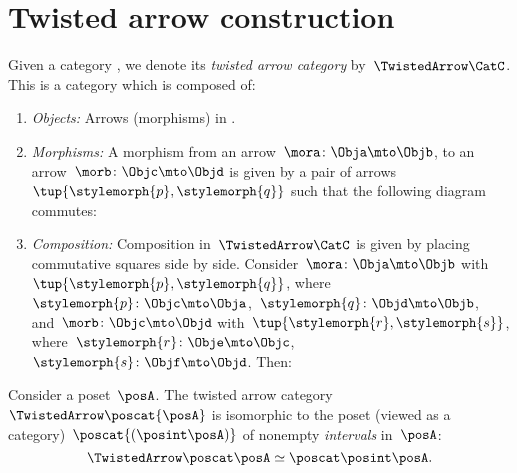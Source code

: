 
\section{Twisted arrow construction}
\begin{ctdefinition}
    \label{def:twisted-arrow-category}
    \label{def:twisted-arrow}
    Given a category \CatC, we denote its \emph{twisted arrow category} by~$\TwistedArrow\CatC$.
    This is a category which is composed of:
    \begin{enumerate}
        \item \emph{Objects:} Arrows (morphisms) in \CatC.
        \item \emph{Morphisms:}
              A morphism from an arrow~$\mora\colon \Obja \mto \Objb $, to an arrow~$\morb\colon \Objc \mto \Objd$ is given by a pair of arrows~$\tup{\stylemorph{p},\stylemorph{q}}$ such that the following diagram commutes:
        \item \emph{Composition:} Composition in~$\TwistedArrow\CatC$ is given by placing commutative squares side by side.
              Consider~$\mora\colon \Obja \mto \Objb$ with~$\tup{\stylemorph{p},\stylemorph{q}}$, where~$\stylemorph{p}\colon \Objc\mto \Obja$,~$\stylemorph{q}\colon \Objd \mto \Objb$, and~$\morb\colon \Objc \mto \Objd$ with~$\tup{\stylemorph{r},\stylemorph{s}}$, where~$\stylemorph{r}\colon \Obje\mto \Objc$,~$\stylemorph{s}\colon \Objf \mto \Objd$.
              Then:
    \end{enumerate}
\end{ctdefinition}


\begin{example}
    \label{exa:twisted-arrow-poset}
    Consider a poset~$\posA$.
    The twisted arrow category~$\TwistedArrow \poscat{\posA}$ is isomorphic to the poset (viewed as a category)~$\poscat{\left(\posint\posA\right)}$ of nonempty \emph{intervals} in~$\posA$:
    \begin{equation}
        \TwistedArrow \poscat \posA \simeq \poscat \posint\posA .
    \end{equation}
\end{example}

